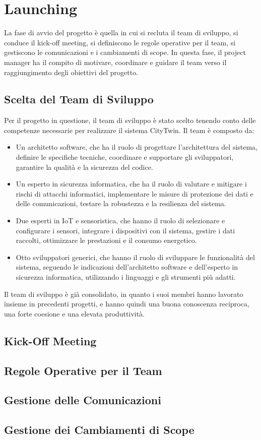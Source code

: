 \chapter{Launching}
La fase di avvio del progetto è quella in cui si recluta il team di sviluppo, si conduce il kick-off meeting, si definiscono le regole operative per il team, si gestiscono le comunicazioni e i cambiamenti di scope. In questa fase, il project manager ha il compito di motivare, coordinare e guidare il team verso il raggiungimento degli obiettivi del progetto.

\section{Scelta del Team di Sviluppo}
Per il progetto in questione, il team di sviluppo è stato scelto tenendo conto delle competenze necessarie per realizzare il sistema CityTwin. Il team è composto da:

\begin{itemize}
    \item Un architetto software, che ha il ruolo di progettare l’architettura del sistema, definire le specifiche tecniche, coordinare e supportare gli sviluppatori, garantire la qualità e la sicurezza del codice.
    \item Un esperto in sicurezza informatica, che ha il ruolo di valutare e mitigare i rischi di attacchi informatici, implementare le misure di protezione dei dati e delle comunicazioni, testare la robustezza e la resilienza del sistema.
    \item Due esperti in IoT e sensoristica, che hanno il ruolo di selezionare e configurare i sensori, integrare i dispositivi con il sistema, gestire i dati raccolti, ottimizzare le prestazioni e il consumo energetico.
    \item Otto sviluppatori generici, che hanno il ruolo di sviluppare le funzionalità del sistema, seguendo le indicazioni dell'architetto software e dell'esperto in sicurezza informatica, utilizzando i linguaggi e gli strumenti più adatti.
\end{itemize}

Il team di sviluppo è già consolidato, in quanto i suoi membri hanno lavorato insieme in precedenti progetti, e hanno quindi una buona conoscenza reciproca, una forte coesione e una elevata produttività.

\section{Kick-Off Meeting}

\section{Regole Operative per il Team}

\section{Gestione delle Comunicazioni}

\section{Gestione dei Cambiamenti di Scope}
